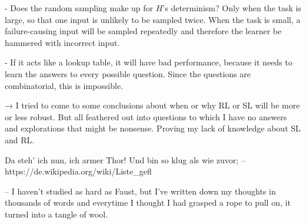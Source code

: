 \documentclass{farlamp}
\begin{document}
- Does the random sampling make up for $H$'s determinism? Only when the task is
large, so that one input is unlikely to be sampled twice. When the task is
small, a failure-causing input will be sampled repeatedly and therefore the
learner be hammered with incorrect input.

- If it acts like a lookup table, it will have bad performance, because it needs
to learn the answers to every possible question. Since the questions are
combinatorial, this is impossible.

→ I tried to come to some conclusions about when or why RL or SL will be more or
less robust. But all feathered out into questions to which I have no answers and
explorations that might be nonsense. Proving my lack of knowledge about SL and
RL.

Da steh’ ich nun, ich armer Thor!
Und bin so klug als wie zuvor;
-- https://de.wikipedia.org/wiki/Liste_gefl%

– I haven't studied as hard as Faust, but I've written down my thoughts in
thousands of words and everytime I thought I had grasped a rope to pull on, it
turned into a tangle of wool.

\printbibliography
\end{document}
